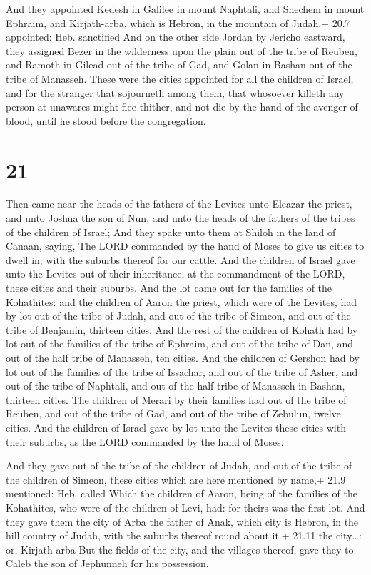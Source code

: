  And they appointed Kedesh in Galilee in mount Naphtali,
and Shechem in mount Ephraim, and Kirjath-arba, which is Hebron, in the
mountain of Judah.+ 20.7 appointed: Heb. sanctified  And on
the other side Jordan by Jericho eastward, they assigned Bezer in the
wilderness upon the plain out of the tribe of Reuben, and Ramoth in
Gilead out of the tribe of Gad, and Golan in Bashan out of the tribe of
Manasseh.  These were the cities appointed for all the
children of Israel, and for the stranger that sojourneth among them,
that whosoever killeth any person at unawares might flee thither, and
not die by the hand of the avenger of blood, until he stood before the
congregation.

\hypertarget{section-20}{%
\section{21}\label{section-20}}

 Then came near the heads of the fathers of the Levites unto
Eleazar the priest, and unto Joshua the son of Nun, and unto the heads
of the fathers of the tribes of the children of Israel;  And
they spake unto them at Shiloh in the land of Canaan, saying, The LORD
commanded by the hand of Moses to give us cities to dwell in, with the
suburbs thereof for our cattle.  And the children of Israel
gave unto the Levites out of their inheritance, at the commandment of
the LORD, these cities and their suburbs.  And the lot came
out for the families of the Kohathites: and the children of Aaron the
priest, which were of the Levites, had by lot out of the tribe of Judah,
and out of the tribe of Simeon, and out of the tribe of Benjamin,
thirteen cities.  And the rest of the children of Kohath had
by lot out of the families of the tribe of Ephraim, and out of the tribe
of Dan, and out of the half tribe of Manasseh, ten cities. 
And the children of Gershon had by lot out of the families of the tribe
of Issachar, and out of the tribe of Asher, and out of the tribe of
Naphtali, and out of the half tribe of Manasseh in Bashan, thirteen
cities.  The children of Merari by their families had out of
the tribe of Reuben, and out of the tribe of Gad, and out of the tribe
of Zebulun, twelve cities.  And the children of Israel gave
by lot unto the Levites these cities with their suburbs, as the LORD
commanded by the hand of Moses.

 And they gave out of the tribe of the children of Judah,
and out of the tribe of the children of Simeon, these cities which are
here mentioned by name,+ 21.9 mentioned: Heb. called  Which
the children of Aaron, being of the families of the Kohathites, who were
of the children of Levi, had: for theirs was the first lot.
 And they gave them the city of Arba the father of Anak,
which city is Hebron, in the hill country of Judah, with the suburbs
thereof round about it.+ 21.11 the city\ldots: or, Kirjath-arba
 But the fields of the city, and the villages thereof, gave
they to Caleb the son of Jephunneh for his possession.

